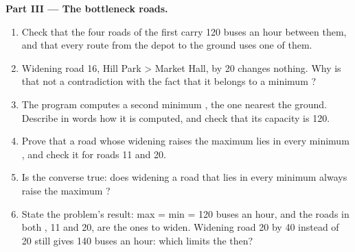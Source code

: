 \begin{problem}
\medskip\noindent\textbf{Part III --- The bottleneck roads.}\par\nopagebreak
\begin{enumerate}[resume, beginpenalty=10000]
\item Check that the four roads of the first  carry 120 buses an hour between them, and that every route from the
depot to the ground uses one of them.
\item Widening road 16, Hill Park > Market Hall, by 20 changes nothing. Why is that not a contradiction with the fact that it belongs to a minimum
?
\item The program computes a second minimum , the one nearest the ground. Describe in words how it is computed, and
check that its capacity is 120.
\item Prove that a road whose widening raises the maximum  lies in every minimum , and check it for roads 11 and 20.
\item Is the converse true: does widening a road that lies in every minimum  always raise the maximum ?
\item State the problem's result: max  = min  = 120 buses an hour, and the roads in both , 11 and 20, are the
ones to widen. Widening road 20 by 40 instead of 20 still gives 140 buses an hour: which  limits the  then?
\end{enumerate}


\end{problem}
